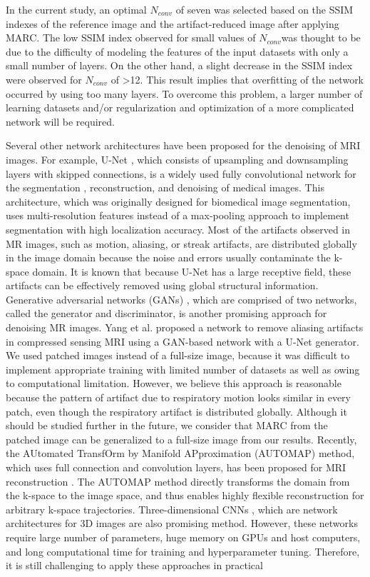 \documentclass[num-refs]{wiley-article}
\begin{document}
In the current study, an optimal $N_{conv}$ of seven was selected based on the SSIM indexes of the reference image and the artifact-reduced image after applying MARC. The low SSIM index observed for small values of $N_{conv}$was thought to be due to the difficulty of modeling the features of the input datasets with only a small number of layers. On the other hand, a slight decrease in the SSIM index were observed for $N_{conv}$ of >12. This result implies that overfitting of the network occurred by using too many layers. To overcome this problem, a larger number of learning datasets and/or regularization and optimization of a more complicated network will be required.

Several other network architectures have been proposed for the denoising of MRI images. For example, U-Net \cite{ronneberger2015u}, which consists of upsampling and downsampling layers with skipped connections, is a widely used fully convolutional network for the segmentation \cite{dalmics2017using}, reconstruction, and denoising\cite{yu2017deep} of medical images. This architecture, which was originally designed for biomedical image segmentation, uses multi-resolution features instead of a max-pooling approach to implement segmentation with high localization accuracy. Most of the artifacts observed in MR images, such as motion, aliasing, or streak artifacts, are distributed globally in the image domain because the noise and errors usually contaminate the k-space domain. It is known that because U-Net has a large receptive field, these artifacts can be effectively removed using global structural information. Generative adversarial networks (GANs) \cite{goodfellow2014generative}, which are comprised of two networks, called the generator and discriminator, is another promising approach for denoising MR images. Yang et al. proposed a network to remove aliasing artifacts in compressed sensing MRI using a GAN-based network with a U-Net generator\cite{yang2018dagan}. We used patched images instead of a full-size image, because it was difficult to implement appropriate training with limited number of datasets as well as owing to computational limitation. However, we believe this approach is reasonable because the pattern of artifact due to respiratory motion looks similar in every patch, even though the respiratory artifact is distributed globally. Although it should be studied further in the future, we consider that MARC from the patched image can be generalized to a full-size image from our results. Recently, the AUtomated TransfOrm by Manifold APproximation (AUTOMAP) method, which uses full connection and convolution layers, has been proposed for MRI reconstruction \cite{zhu2018image}. The AUTOMAP method directly transforms the domain from the k-space to the image space, and thus enables highly flexible reconstruction for arbitrary k-space trajectories. Three-dimensional CNNs , which are network architectures for 3D images \cite{kamnitsas2017efficient}\cite{chen2018efficient} are also promising method. However, these networks require large number of parameters, huge memory on GPUs and host computers, and long computational time for training and hyperparameter tuning. Therefore, it is still challenging to apply these approaches in practical 
\end{document}
